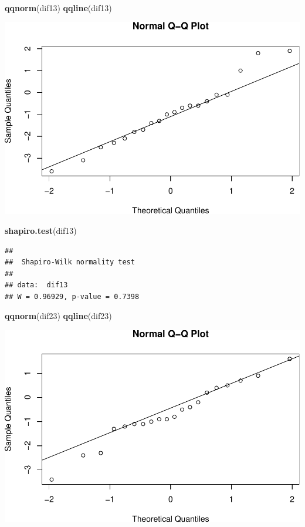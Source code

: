 \documentclass[
]{book}
\newenvironment{Shaded}{\begin{snugshade}}{\end{snugshade}}
\newcommand{\FunctionTok}[1]{\textcolor[rgb]{0.13,0.29,0.53}{\textbf{#1}}}
\newcommand{\NormalTok}[1]{#1}
\begin{document}
\begin{Shaded}
\begin{Highlighting}[]
\FunctionTok{qqnorm}\NormalTok{(dif13)}
\FunctionTok{qqline}\NormalTok{(dif13)}
\end{Highlighting}
\end{Shaded}

\includegraphics{LivroEstatisticaR_files/figure-latex/AnovaRnormtest-2.pdf}

\begin{Shaded}
\begin{Highlighting}[]
\FunctionTok{shapiro.test}\NormalTok{(dif13)}
\end{Highlighting}
\end{Shaded}

\begin{verbatim}
## 
##  Shapiro-Wilk normality test
## 
## data:  dif13
## W = 0.96929, p-value = 0.7398
\end{verbatim}

\begin{Shaded}
\begin{Highlighting}[]
\FunctionTok{qqnorm}\NormalTok{(dif23)}
\FunctionTok{qqline}\NormalTok{(dif23)}
\end{Highlighting}
\end{Shaded}

\includegraphics{LivroEstatisticaR_files/figure-latex/AnovaRnormtest-3.pdf}
\end{document}
